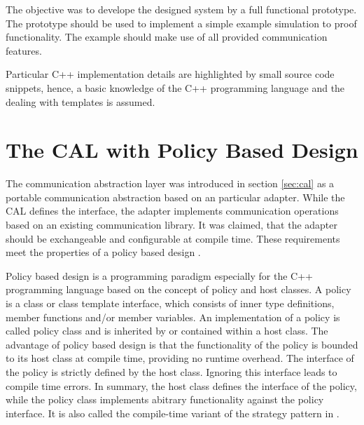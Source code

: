 The objective was to develope the designed system by a full functional prototype.
The prototype should be used to implement a simple example simulation
to proof functionality. The example should make use of all provided
communication features.

Particular C++ implementation details are highlighted by small source
code snippets, hence, a basic knowledge of the C++ programming
language and the dealing with templates is assumed.

\section{The CAL with Policy Based Design}

The communication abstraction layer was introduced in section
\ref{sec:cal} as a portable communication abstraction based on an
particular adapter. While the CAL defines the interface, the adapter
implements communication operations based on an existing communication
library.  It was claimed, that the adapter should be exchangeable and
configurable at compile time. These requirements meet the properties of
a policy based design \cite{ref:policy_based_design}.

Policy based design is a programming paradigm especially for the C++
programming language based on the concept of policy and host classes.
A policy is a class or class template interface, which consists of
inner type definitions, member functions and/or member variables. An
implementation of a policy is called policy class and is inherited by
or contained within a host class.  The advantage of policy based
design is that the functionality of the policy is bounded to its host
class at compile time, providing no runtime overhead.  The interface
of the policy is strictly defined by the host class. Ignoring this
interface leads to compile time errors. In summary, the host class
defines the interface of the policy, while the policy class implements
abitrary functionality against the policy interface. It is also called
the compile-time variant of the strategy pattern in
\cite{ref:policy_strategy}.

